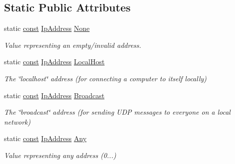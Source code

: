 \subsection*{Static Public Attributes}
\begin{DoxyCompactItemize}
\item 
static \hyperlink{term__entry_8h_a57bd63ce7f9a353488880e3de6692d5a}{const} \hyperlink{classsf_1_1_ip_address}{Ip\-Address} \hyperlink{classsf_1_1_ip_address_af95b0353e632372b5266d6227bc0e3ec}{None}
\begin{DoxyCompactList}\small\item\em Value representing an empty/invalid address. \end{DoxyCompactList}\item 
static \hyperlink{term__entry_8h_a57bd63ce7f9a353488880e3de6692d5a}{const} \hyperlink{classsf_1_1_ip_address}{Ip\-Address} \hyperlink{classsf_1_1_ip_address_ac545220c940d381c677113841a218bda}{Local\-Host}
\begin{DoxyCompactList}\small\item\em The \char`\"{}localhost\char`\"{} address (for connecting a computer to itself locally) \end{DoxyCompactList}\item 
static \hyperlink{term__entry_8h_a57bd63ce7f9a353488880e3de6692d5a}{const} \hyperlink{classsf_1_1_ip_address}{Ip\-Address} \hyperlink{classsf_1_1_ip_address_aefb978156901e01e2d9642815be10abe}{Broadcast}
\begin{DoxyCompactList}\small\item\em The \char`\"{}broadcast\char`\"{} address (for sending U\-D\-P messages to everyone on a local network) \end{DoxyCompactList}\item 
static \hyperlink{term__entry_8h_a57bd63ce7f9a353488880e3de6692d5a}{const} \hyperlink{classsf_1_1_ip_address}{Ip\-Address} \hyperlink{classsf_1_1_ip_address_a3dbc10b0dc6804cc69e29342f7406907}{Any}
\begin{DoxyCompactList}\small\item\em Value representing any address (0...) \end{DoxyCompactList}\end{DoxyCompactItemize}
